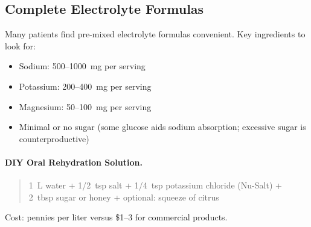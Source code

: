 \subsection{Complete Electrolyte Formulas}

Many patients find pre-mixed electrolyte formulas convenient. Key ingredients to look for:
\begin{itemize}
    \item Sodium: 500--1000~mg per serving
    \item Potassium: 200--400~mg per serving
    \item Magnesium: 50--100~mg per serving
    \item Minimal or no sugar (some glucose aids sodium absorption; excessive sugar is counterproductive)
\end{itemize}

\paragraph{DIY Oral Rehydration Solution.}
\begin{quote}
1~L water + 1/2~tsp salt + 1/4~tsp potassium chloride (Nu-Salt) + 2~tbsp sugar or honey + optional: squeeze of citrus
\end{quote}
Cost: pennies per liter versus \$1--3 for commercial products.

